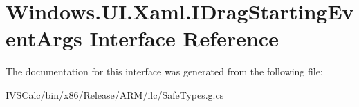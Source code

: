 \hypertarget{interface_windows_1_1_u_i_1_1_xaml_1_1_i_drag_starting_event_args}{}\section{Windows.\+U\+I.\+Xaml.\+I\+Drag\+Starting\+Event\+Args Interface Reference}
\label{interface_windows_1_1_u_i_1_1_xaml_1_1_i_drag_starting_event_args}


The documentation for this interface was generated from the following file\+:\begin{DoxyCompactItemize}
\item 
I\+V\+S\+Calc/bin/x86/\+Release/\+A\+R\+M/ilc/Safe\+Types.\+g.\+cs\end{DoxyCompactItemize}
